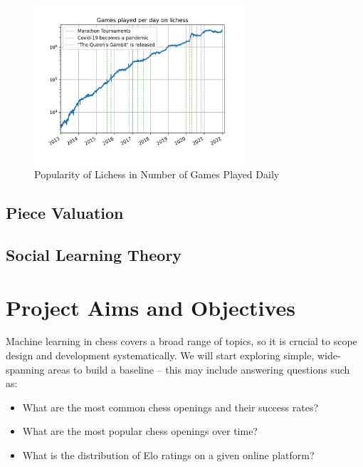 \documentclass[%
 superscriptaddress,
showpacs,preprintnumbers,
 amsmath,
 amssymb,
 aps,
 pra,
showkeys,
onecolumn,
notitlepage,
11pt,
tightenlines      %
]{revtex4-1}
\begin{document}
\begin{figure}[h]
    \caption{Popularity of Lichess in Number of Games Played Daily \cite{chessOpeningStats}}
    \begin{center}
    \includegraphics[width=0.7\textwidth]{images/Lichess Number of Games Played Per Day.png}
    \end{center}
\end{figure}

\subsection{Piece Valuation}

\subsection{Social Learning Theory}



\section{Project Aims and Objectives}
Machine learning in chess covers a broad range of topics, so it is crucial to scope design and development systematically. We will start exploring simple, wide-spanning areas to build a baseline -- this may include answering questions such as:

\begin{itemize}
    \item What are the most common chess openings and their success rates?
    \item What are the most popular chess openings over time?
    \item What is the distribution of Elo ratings on a given online platform?
\end{itemize}
\end{document}
